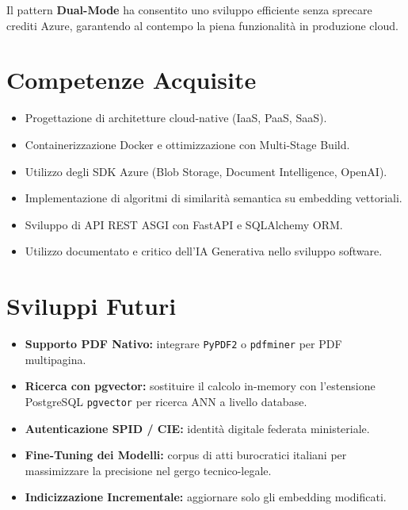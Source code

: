 \documentclass[12pt,a4paper,oneside]{report}
\begin{document}
Il pattern \textbf{Dual-Mode} ha consentito uno sviluppo efficiente senza sprecare
crediti Azure, garantendo al contempo la piena funzionalit\`{a} in produzione cloud.

\section{Competenze Acquisite}

\begin{itemize}
    \item Progettazione di architetture cloud-native (IaaS, PaaS, SaaS).
    \item Containerizzazione Docker e ottimizzazione con Multi-Stage Build.
    \item Utilizzo degli SDK Azure (Blob Storage, Document Intelligence, OpenAI).
    \item Implementazione di algoritmi di similarit\`{a} semantica su embedding vettoriali.
    \item Sviluppo di API REST ASGI con FastAPI e SQLAlchemy ORM.
    \item Utilizzo documentato e critico dell'IA Generativa nello sviluppo software.
\end{itemize}

\section{Sviluppi Futuri}

\begin{itemize}
    \item \textbf{Supporto PDF Nativo:} integrare \texttt{PyPDF2} o \texttt{pdfminer} per PDF multipagina.
    \item \textbf{Ricerca con pgvector:} sostituire il calcolo in-memory con l'estensione
          PostgreSQL \texttt{pgvector} per ricerca ANN a livello database.
    \item \textbf{Autenticazione SPID / CIE:} identit\`{a} digitale federata ministeriale.
    \item \textbf{Fine-Tuning dei Modelli:} corpus di atti burocratici italiani per
          massimizzare la precisione nel gergo tecnico-legale.
    \item \textbf{Indicizzazione Incrementale:} aggiornare solo gli embedding modificati.
\end{itemize}
\end{document}
